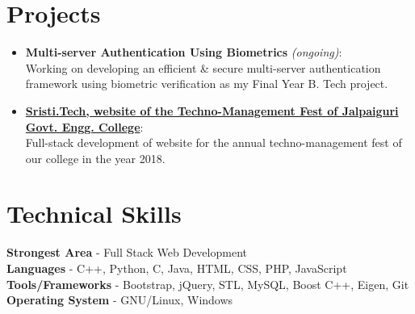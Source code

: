 \documentclass[margin, centered, a4paper]{res}
\begin{document}
\begin{resume}
\section{Projects}
\begin{itemize}[leftmargin=*]
\item
\textbf{Multi-server Authentication Using Biometrics} \textit{(ongoing)}:\\ Working on developing an efficient \& secure multi-server authentication framework using biometric verification as my Final Year B. Tech project.
\item
\textbf{\href{http://sristi.tech}{Sristi.Tech, website of the Techno-Management Fest of Jalpaiguri Govt. Engg. College}}:\\ Full-stack development of website for the annual techno-management fest of our college in the year 2018.
 
\end{itemize}

\section{Technical Skills}
\textbf{Strongest Area} - Full Stack Web Development\\
\textbf{Languages} - C++, Python, C, Java, HTML, CSS, PHP, JavaScript\\
\textbf{Tools/Frameworks} - Bootstrap, jQuery, STL, MySQL, Boost C++, Eigen, Git\\
\textbf{Operating System} - GNU/Linux, Windows




\end{resume}
\end{document}
